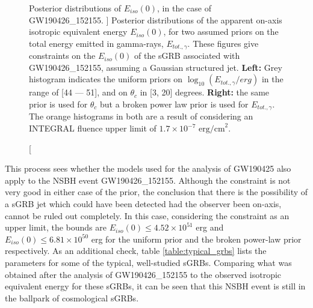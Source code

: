     \begin{figure}[H]
        \begin{subfigure}{0.5\textwidth}
              \label{fig:nsbh_unif}
              \centering
              \def\svgwidth{\textwidth}
              
        \end{subfigure}%
        \begin{subfigure}{0.5\textwidth}
              \label{fig:nsbh_bpl}
              \centering
              \def\svgwidth{\textwidth}
              
        \end{subfigure}
        \caption
        [
            Posterior distributions of $E_{iso}(0)$, in the case of GW190426\_152155.
        ]
        {
            Posterior distributions of the apparent on-axis isotropic equivalent energy
            $E_{iso}(0)$, for two assumed priors on the total energy emitted in
            gamma-rays, $E_{tot., \gamma}$. These figures give constraints on the
            $E_{iso}(0)$ of the sGRB associated with GW190426\_152155, assuming a
            Gaussian structured jet. \textbf{Left:} Grey histogram indicates the uniform
            priors on $\log_{10}(E_{tot., \gamma}/erg)$ in the range of [44 --- 51], and
            on $\theta_c$ in [3, 20] degrees. \textbf{Right:} the same prior is used for
            $\theta_c$ but a broken power law prior is used for $E_{tot., \gamma}$. The
            orange histograms in both are a result of considering an INTEGRAL fluence
            upper limit of $1.7 \times 10^{-7} \text{ erg/cm}^2$.
        }
        \label{fig:nsbh_unif_bpl}
    \end{figure}

    This process sees whether the models used for the analysis of GW190425 also apply to
    the NSBH event GW190426\_152155. Although the constraint is not very good in either
    case of the prior, the conclusion that there is the possibility of a sGRB jet which
    could have been detected had the observer been on-axis, cannot be ruled out
    completely. In this case, considering the constraint as an upper limit, the bounds
    are $E_{iso}(0) \leq 4.52 \times 10^{51}$ erg and $E_{iso}(0) \leq 6.81 \times
    10^{50}$ erg for the uniform prior and the broken power-law prior respectively.  As
    an additional check, table \ref{table:typical_grbs} lists the parameters for some of
    the typical, well-studied sGRBs. Comparing what was obtained after the analysis of
    GW190426\_152155 to the observed isotropic equivalent energy for these sGRBs, it can
    be seen that this NSBH event is still in the ballpark of cosmological sGRBs.

